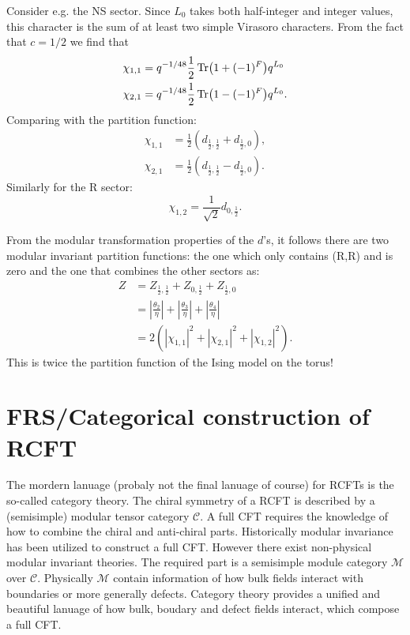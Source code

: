 \documentclass[submission, PhysLectNotes]{SciPost}
\begin{document}
Consider e.g. the NS sector. Since $L_0$ takes both half-integer and integer values, this character is the sum of at least two simple Virasoro characters. From the fact that $c=1/2$ we find that
\begin{align}
	\chi_{1,1} &= q^{-1/48}\frac{1}{2}\Tr(1+(-1)^F)q^{L_0}\\
	\chi_{2,1} &= q^{-1/48}\frac{1}{2}\Tr(1-(-1)^F)q^{L_0}.
\end{align}
Comparing with the partition function:
\begin{align}
	\chi_{1,1} &= \frac{1}{2}\left(d_{\frac{1}{2},\frac{1}{2}} + d_{\frac{1}{2},0}\right),\\
	\chi_{2,1} &= \frac{1}{2}\left(d_{\frac{1}{2},\frac{1}{2}} - d_{\frac{1}{2},0}\right).
\end{align}
Similarly for the R sector:
\begin{equation}
	\chi_{1,2} = \frac{1}{\sqrt{2}}d_{0,\frac{1}{2}}.
\end{equation}

From the modular transformation properties of the $d$'s, it follows there are two modular invariant partition functions: the one which only contains (R,R) and is zero and the one that combines the other sectors as:
\begin{align}
	Z &= Z_{\frac{1}{2},\frac{1}{2}} + Z_{0,\frac{1}{2}} + Z_{\frac{1}{2},0}\\
	&= \left|\frac{\theta_2}{\eta}\right| + \left|\frac{\theta_3}{\eta}\right| + \left|\frac{\theta_4}{\eta}\right|\\
	&= 2\left(|\chi_{1,1}|^2 + |\chi_{2,1}|^2 + |\chi_{1,2}|^2\right).
\end{align}
This is twice the partition function of the Ising model on the torus!



\section{FRS/Categorical construction of RCFT}
The mordern lanuage (probaly not the final lanuage of course) for RCFTs is the so-called category theory. The chiral symmetry of a RCFT is described by a (semisimple) modular tensor category $\mathcal{C}$. A full CFT requires the knowledge of how to combine the chiral and anti-chiral parts. Historically modular invariance has been utilized to construct a full CFT. However there exist non-physical modular invariant theories. The required part is a semisimple module category $\mathcal{M}$ over $\mathcal{C}$. Physically $\mathcal{M}$ contain information of how bulk fields interact with boundaries or more generally defects. Category theory provides a unified and beautiful lanuage of how bulk, boudary and defect fields interact, which compose a full CFT. 
\end{document}
